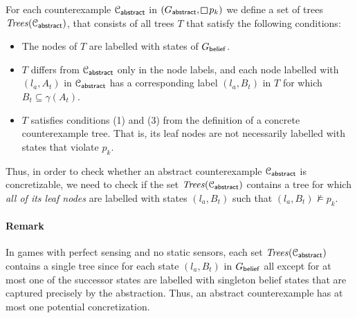 For each counterexample $\mathcal{C}_{\mathsf{abstract}}$ in $(G_\abstr,\LTLglobally p_k)$ we define a set of trees $\mathit{Trees}(\mathcal{C}_{\mathsf{abstract}})$, that consists of all trees $T$ that satisfy the following conditions:
\begin{itemize}
    \item The nodes of $T$ are labelled with states of $G_{\mathsf{belief}}$.
    \item $T$ differs from $\mathcal{C}_{\mathsf{abstract}}$ only in the node labels, and each node labelled with $(l_a,A_t)$ in $\mathcal{C}_{\mathsf{abstract}}$ has a corresponding label $(l_a, B_t)$ in $T$ for which $B_t \subseteq \gamma(A_t)$.
    \item $T$ satisfies conditions (1) and (3) from the definition of a concrete counterexample tree. That is, its leaf nodes are not necessarily labelled with states that violate $p_k$.
\end{itemize}


Thus, in order to check whether an abstract counterexample $\mathcal{C}_{\mathsf{abstract}}$ is concretizable, we need to check if the set $\mathit{Trees}(\mathcal{C}_{\mathsf{abstract}})$ contains a tree for which \emph{all of its leaf nodes} are labelled with states $(l_a, B_t)$ such that $(l_a,B_t) \not \models p_k$.

\paragraph{Remark} In games with perfect sensing and no static sensors, each set $\mathit{Trees}(\mathcal{C}_{\mathsf{abstract}})$ contains a single tree since for each state $(l_a,B_t)$ in $G_{\mathsf{belief}}$ all except for at most one of the successor states are labelled with singleton belief states that are captured precisely by the abstraction. Thus, an abstract counterexample has at most one potential concretization.